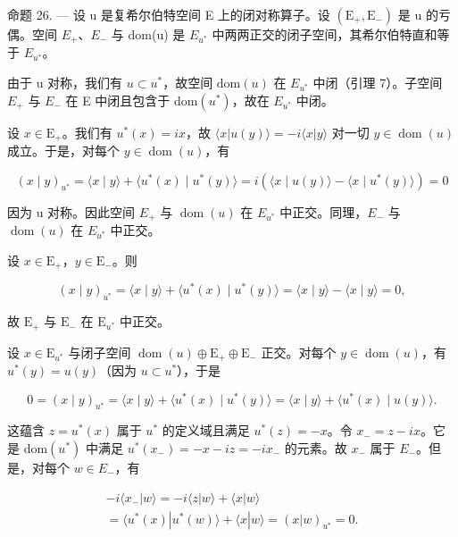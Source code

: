 命题 26. --- 设 u 是复希尔伯特空间 E 上的闭对称算子。设 \((\mathrm{E}_{+}, \mathrm{E}_{-})\) 是 u 的亏偶。空间 \(E_{+}\)、\(E_{-}\) 与 dom(u) 是 \(E_{u^{*}}\) 中两两正交的闭子空间，其希尔伯特直和等于 \(E_{u^{*}}\)。

由于 u 对称，我们有 \(u \subset u^{*}\)，故空间 \(\text{dom}(u)\) 在 \(E_{u^{*}}\) 中闭（引理 7）。子空间 \(E_{+}\) 与 \(E_{-}\) 在 E 中闭且包含于 \(\text{dom}(u^{*})\)，故在 \(E_{u^{*}}\) 中闭。

设 \(x \in \mathrm{E}_{+}\)。我们有 \(u^{*}(x) = ix\)，故 \(\langle x | u(y) \rangle = -i\langle x | y \rangle\) 对一切 \(y \in \operatorname{dom}(u)\) 成立。于是，对每个 \(y \in \operatorname{dom}(u)\)，有

\[
(x \mid y) _ {u ^ {*}} = \langle x \mid y \rangle + \langle u ^ {*} (x) \mid u ^ {*} (y) \rangle = i (\langle x \mid u (y) \rangle - \langle x \mid u ^ {*} (y) \rangle) = 0
\]

因为 u 对称。因此空间 \(E_{+}\) 与 \(\operatorname{dom}(u)\) 在 \(E_{u^{*}}\) 中正交。同理，\(E_{-}\) 与 \(\operatorname{dom}(u)\) 在 \(E_{u^{*}}\) 中正交。

设 \(x \in \mathrm{E}_{+}\)，\(y \in \mathrm{E}_{-}\)。则

\[
(x \mid y) _ {u ^ {*}} = \langle x \mid y \rangle + \langle u ^ {*} (x) \mid u ^ {*} (y) \rangle = \langle x \mid y \rangle - \langle x \mid y \rangle = 0,
\]

故 \(\mathrm{E}_{+}\) 与 \(\mathrm{E}_{-}\) 在 \(\mathrm{E}_{u^{*}}\) 中正交。

设 \(x \in \mathrm{E}_{u^*}\) 与闭子空间 \(\operatorname{dom}(u) \oplus \mathrm{E}_+ \oplus \mathrm{E}_-\) 正交。对每个 \(y \in \operatorname{dom}(u)\)，有 \(u^*(y) = u(y)\)（因为 \(u \subset u^*\)），于是

\[
0 = (x \mid y) _ {u ^ {*}} = \langle x \mid y \rangle + \langle u ^ {*} (x) \mid u ^ {*} (y) \rangle = \langle x \mid y \rangle + \langle u ^ {*} (x) \mid u (y) \rangle .
\]

这蕴含 \(z = u^{*}(x)\) 属于 \(u^{*}\) 的定义域且满足 \(u^{*}(z) = -x\)。令 \(x_{-} = z - ix\)。它是 \(\text{dom}(u^{*})\) 中满足 \(u^{*}(x_{-}) = -x - iz = -ix_{-}\) 的元素。故 \(x_{-}\) 属于 \(E_{-}\)。但是，对每个 \(w \in E_{-}\)，有

\[
\begin{array}{c} - i \langle x _ {-} | w \rangle = - i \langle z | w \rangle + \langle x | w \rangle \\ = \langle u ^ {*} (x) | u ^ {*} (w) \rangle + \langle x | w \rangle = (x | w) _ {u ^ {*}} = 0. \end{array}
\]

